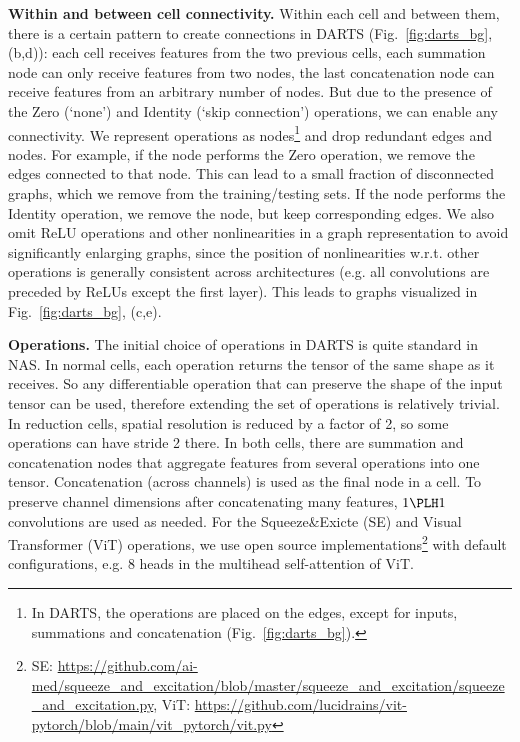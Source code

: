 \textbf{Within and between cell connectivity.}
Within each cell and between them, there is a certain pattern to create connections in DARTS (Fig.~\ref{fig:darts_bg}, (b,d)): each cell receives features from the two previous cells, each summation node can only receive features from two nodes, the last concatenation node can receive features from an arbitrary number of nodes. But due to the presence of the Zero (`none') and Identity (`skip connection') operations, we can enable any connectivity. 
We represent operations as nodes\footnote{In DARTS, the operations are placed on the edges, except for inputs, summations and concatenation (Fig.~\ref{fig:darts_bg}).} and drop redundant edges and nodes. For example, if the node performs the Zero operation, we remove the edges connected to that node. This can lead to a small fraction of disconnected graphs, which we remove from the training/testing sets. If the node performs the Identity operation, we remove the node, but keep corresponding edges. 
We also omit ReLU operations and other nonlinearities in a graph representation to avoid significantly enlarging graphs, since the position of nonlinearities w.r.t. other operations is generally consistent across architectures (e.g. all convolutions are preceded by ReLUs except the first layer).
This leads to graphs visualized in Fig.~\ref{fig:darts_bg}, (c,e).

\textbf{Operations.} The initial choice of operations in DARTS is quite standard in NAS. In normal cells, each operation returns the tensor of the same shape as it receives. So any differentiable operation that can preserve the shape of the input tensor can be used, therefore extending the set of operations is relatively trivial. In reduction cells, spatial resolution is reduced by a factor of 2, so some operations can have stride 2 there. In both cells, there are summation and concatenation nodes that aggregate features from several operations into one tensor. Concatenation (across channels) is used as the final node in a cell. To preserve channel dimensions after concatenating many features, $1\PLH 1$ convolutions are used as needed.
For the Squeeze\&Exicte (SE) and Visual Transformer (ViT) operations, we use open source implementations\footnote{SE: \url{https://github.com/ai-med/squeeze_and_excitation/blob/master/squeeze_and_excitation/squeeze_and_excitation.py}, ViT: \url{https://github.com/lucidrains/vit-pytorch/blob/main/vit_pytorch/vit.py}} with default configurations, e.g. 8 heads in the multihead self-attention of ViT.


